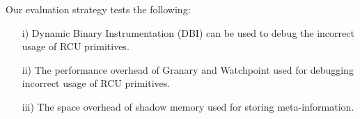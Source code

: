 Our evaluation strategy tests the following:
\begin{enumerate}
	\item[i)] Dynamic Binary Instrumentation (DBI) can be used to debug the incorrect usage of RCU primitives.
	\item[ii)] The performance overhead of Granary and Watchpoint used for debugging incorrect usage of RCU primitives.
	\item[iii)] The space overhead of shadow memory used for storing meta-information.
\end{enumerate}

